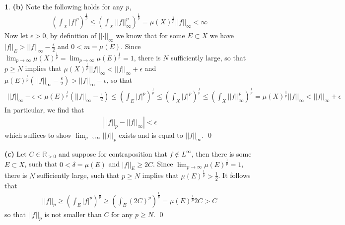 \documentclass[10.5pt]{article}
\theoremstyle{definition}
\newtheorem{pb}{}
\newcommand{\abs}[1]{\left\vert#1\right\vert}
\newcommand{\norm}[1]{\lvert\lvert#1\rvert\rvert}
\begin{document}
\begin{pb}
        \textbf{(b)}
        Note the following holds for any \(p\),
        \begin{align*}
            \left(\int_X \abs{f}^p\right)^{\frac{1}{p}} \leq \left(\int_X \norm{f}_\infty^p\right)^{\frac{1}{p}} = \mu(X)^{\frac{1}{p}}\norm{f}_\infty < \infty
        \end{align*}
        Now let \(\epsilon > 0\), by definition of \(\norm{\cdot}_\infty\) we know that for some \(E \subset X\) we have \(\abs{f}\vert_E > \norm{f}_\infty - \frac{\epsilon}{2}\) and \(0 < m = \mu(E)\). Since \(\lim_{p\to\infty}\mu(X)^{\frac{1}{p}} = \lim_{p\to\infty}\mu(E)^{\frac{1}{p}} = 1\), there is \(N\) sufficiently large, so that \(p \geq N\) implies that \(\mu(X)^{\frac{1}{p}}\norm{f}_\infty < \norm{f}_\infty + \epsilon\) and \(\mu(E)^{\frac{1}{p}}(\norm{f}_\infty - \frac{\epsilon}{2}) > \norm{f}_\infty - \epsilon\), so that
        \begin{align*}
            \norm{f}_\infty - \epsilon < \mu(E)^{\frac{1}{p}}\left(\norm{f}_\infty - \frac{\epsilon}{2}\right) \leq \left(\int_E\abs{f}^p\right)^{\frac{1}{p}} \leq \left(\int_X \abs{f}^p\right)^{\frac{1}{p}} \leq \left(\int_X \norm{f}_\infty^p\right)^{\frac{1}{p}} = \mu(X)^{\frac{1}{p}}\norm{f}_\infty < \norm{f}_\infty + \epsilon
        \end{align*}
        In particular, we find that
        \begin{align*}
            \abs{\norm{f}_p - \norm{f}_\infty} < \epsilon
        \end{align*}
        which suffices to show \(\lim_{p\to\infty} \norm{f}_p\) exists and is equal to \(\norm{f}_\infty\). \qed

        \textbf{(c)} Let \(C \in \mathbb{R}_{>0}\) and suppose for contraposition that \(f \not \in L^\infty\), then there is some \(E \subset X\), such that \(0 < \delta = \mu(E)\) and \(\abs{f}\vert_E \geq 2C\). Since \(\lim_{p\to\infty}\mu(E)^{\frac{1}{p}} = 1\), there is \(N\) sufficiently large, such that \(p \geq N\) implies that \(\mu(E)^{\frac{1}{p}} > \frac12\). It follows that
        \begin{align*}
            \norm{f}_p \geq \left(\int_E \abs{f}^p\right)^{\frac{1}{p}} \geq \left(\int_E (2C)^p\right)^{\frac{1}{p}} = \mu(E)^{\frac{1}{p}}2C > C
        \end{align*}
        so that \(\norm{f}_p\) is not smaller than \(C\) for any \(p \geq N\). \qed


\end{pb}
\end{document}
